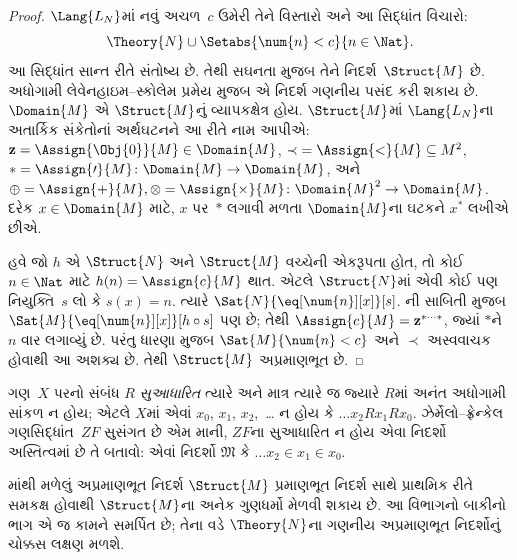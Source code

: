 \begin{proof}
$\Lang{L_N}$માં નવું અચળ~$c$
ઉમેરી તેને વિસ્તારો અને આ સિદ્ધાંત વિચારો:
\[
\Theory{N} \cup \Setabs{\num{n} < c}{n \in \Nat}.
\]
આ સિદ્ધાંત સાન્ત રીતે સંતોષ્ય છે.
તેથી સઘનતા મુજબ તેને નિદર્શ~$\Struct{M}$
છે. અધોગામી લેવેનહાઇમ--સ્કોલેમ પ્રમેય
મુજબ એ નિદર્શ ગણનીય પસંદ
કરી શકાય છે. $\Domain{M}$ એ
$\Struct{M}$નું વ્યાપકક્ષેત્ર હોય.
$\Struct{M}$માં $\Lang{L_N}$ના
અતાર્કિક સંકેતોનાં અર્થઘટનને આ રીતે
નામ આપીએ: $\mathbf{z} = \Assign{\Obj{0}}{M} \in \Domain{M}$,
${\prec} = \Assign{<}{M} \subseteq M^2$,
$* = \Assign{\prime}{M} \colon
\Domain{M} \to \Domain{M}$, અને
$\oplus = \Assign{+}{M}, \otimes =
\Assign{\times}{M} \colon \Domain{M}^2 \to \Domain{M}$.
દરેક $x \in \Domain{M}$ માટે,
$x$ પર~$*$ લગાવી મળતા
$\Domain{M}$ના ઘટકને $x^*$
લખીએ છીએ.

હવે જો $h$ એ $\Struct{N}$ અને
$\Struct{M}$ વચ્ચેની એકરૂપતા હોત,
તો કોઈ $n \in \Nat$ માટે
$h(n) = \Assign{c}{M}$ થાત.
એટલે $\Struct{N}$માં એવી
કોઈ પણ નિયુક્તિ~$s$ લો કે
$s(x) = n$. ત્યારે
$\Sat{N}{\eq[\num{n}][x]}[s]$.
ની સાબિતી
મુજબ $\Sat{M}{\eq[\num{n}][x]}[h \circ s]$
પણ છે; તેથી $\Assign{c}{M} =
\mathbf{z}^{*\cdots *}$, જ્યાં
$*$ને $n$ વાર લગાવ્યું છે.
પરંતુ ધારણા મુજબ
$\Sat{M}{\num{n} < c}$ અને
$\prec$ અસ્વવાચક હોવાથી
આ અશક્ય છે. તેથી
$\Struct{M}$ અપ્રમાણભૂત છે.
\end{proof}

\begin{prob}
ગણ~$X$ પરનો સંબંધ $R$
\emph{સુઆધારિત} ત્યારે અને માત્ર ત્યારે
જ જ્યારે $R$માં અનંત અધોગામી
સાંકળ ન હોય; એટલે $X$માં
એવાં $x_0$, $x_1$, $x_2$,~\dots
ન હોય કે $\dots x_2Rx_1Rx_0$.
ઝેર્મેલો--ફ્રેન્કેલ ગણસિદ્ધાંત~$ZF$
સુસંગત છે એમ માની, $ZF$ના
સુઆધારિત ન હોય એવા નિદર્શો
અસ્તિત્વમાં છે તે બતાવો:
એવાં નિદર્શો $\mathfrak{M}$
કે $\dots x_2 \in x_1 \in x_0$.
\end{prob}

માંથી મળેલું
અપ્રમાણભૂત નિદર્શ $\Struct{M}$
પ્રમાણભૂત નિદર્શ સાથે
પ્રાથમિક રીતે સમકક્ષ હોવાથી
$\Struct{M}$ના અનેક ગુણધર્મો
મેળવી શકાય છે. આ વિભાગનો
બાકીનો ભાગ એ જ કામને સમર્પિત
છે; તેના વડે $\Theory{N}$ના
ગણનીય અપ્રમાણભૂત
નિદર્શોનું ચોક્કસ લક્ષણ
મળશે.

